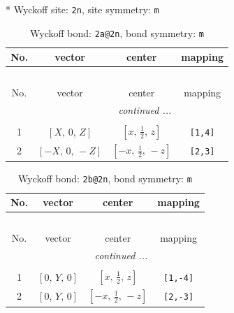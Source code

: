 \documentclass[fleqn,8pt]{jsarticle}
\begin{document}
* Wyckoff site: {\tt 2n}, site symmetry: {\tt m}
\renewcommand{\arraystretch}{1.2}
\begin{longtable}{cccc}
\caption{Wyckoff bond: {\tt 2a@2n}, bond symmetry: {\tt m}}
 \\
 \hline \hline
No. & vector & center & mapping \\ \hline \endfirsthead

\multicolumn{3}{l}{\tablename\ \thetable{}} \\
 \hline \hline
No. & vector & center & mapping \\ \hline \endhead

 \hline \hline
\multicolumn{3}{r}{\footnotesize\it continued ...} \\ \endfoot

 \hline \hline
\multicolumn{3}{r}{} \\ \endlastfoot

1 & $\left[ X,\, 0,\, Z \right]$ & $\left[ x,\, \frac{1}{2},\, z \right]$ & {\tt [1,4]} \\ \hline
2 & $\left[ - X,\, 0,\, - Z \right]$ & $\left[ - x,\, \frac{1}{2},\, - z \right]$ & {\tt [2,3]} \\
\end{longtable}
\renewcommand{\arraystretch}{1.2}
\begin{longtable}{cccc}
\caption{Wyckoff bond: {\tt 2b@2n}, bond symmetry: {\tt m}}
 \\
 \hline \hline
No. & vector & center & mapping \\ \hline \endfirsthead

\multicolumn{3}{l}{\tablename\ \thetable{}} \\
 \hline \hline
No. & vector & center & mapping \\ \hline \endhead

 \hline \hline
\multicolumn{3}{r}{\footnotesize\it continued ...} \\ \endfoot

 \hline \hline
\multicolumn{3}{r}{} \\ \endlastfoot

1 & $\left[ 0,\, Y,\, 0 \right]$ & $\left[ x,\, \frac{1}{2},\, z \right]$ & {\tt [1,-4]} \\ \hline
2 & $\left[ 0,\, Y,\, 0 \right]$ & $\left[ - x,\, \frac{1}{2},\, - z \right]$ & {\tt [2,-3]} \\
\end{longtable}
\renewcommand{\arraystretch}{1.2}
\end{document}
